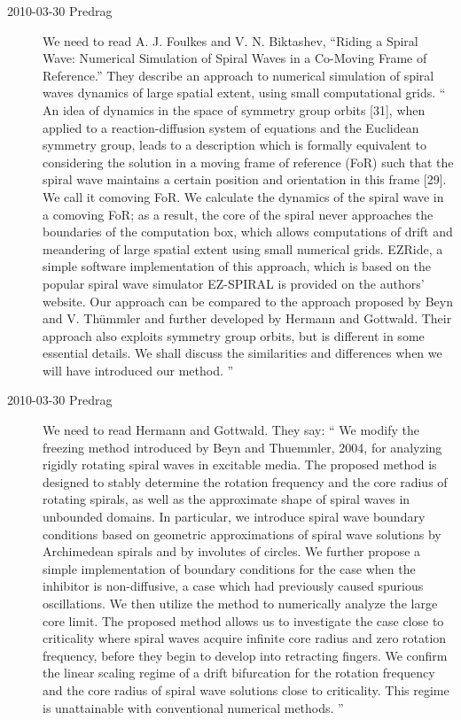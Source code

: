 \begin{description}
\item[2010-03-30 Predrag]
We need to read
A. J. Foulkes and V. N. Biktashev,
``Riding a Spiral Wave: Numerical Simulation of Spiral Waves
in a Co-Moving Frame of Reference.''
They describe an approach to numerical simulation of spiral
waves dynamics of large spatial extent, using small
computational grids.
``
An idea of dynamics in the space of symmetry group
orbits [31], when applied to a reaction-diffusion system
of equations and the Euclidean symmetry group, leads to
a description which is formally equivalent to considering
the solution in a moving frame of reference (FoR) such
that the spiral wave maintains a certain position and orientation
in this frame [29]. We call it comoving FoR.
We calculate
the dynamics of the spiral wave in a comoving FoR;
as a result, the core of the spiral never approaches the
boundaries of the computation box, which allows computations
of drift and meandering of large spatial extent using
small numerical grids. EZRide, a simple software implementation
of this approach, which is based on the popular spiral
wave simulator EZ-SPIRAL is provided on the authors' website.
Our approach can be compared to the approach proposed
by Beyn and V. Th\"ummler and further developed
by Hermann and Gottwald. Their approach also exploits
symmetry group orbits, but is different in some
essential details. We shall discuss the similarities and
differences when we will have introduced our method.
''

\item[2010-03-30 Predrag]
We need to read
    {Hermann and Gottwald}. They say:
``
We modify the freezing method introduced by Beyn and
Thuemmler, 2004, for analyzing rigidly rotating spiral waves
in excitable media. The proposed method is designed to stably
determine the rotation frequency and the core radius of
rotating spirals, as well as the approximate shape of spiral
waves in unbounded domains. In particular, we introduce
spiral wave boundary conditions based on geometric
approximations of spiral wave solutions by Archimedean
spirals and by involutes of circles. We further propose a
simple implementation of boundary conditions for the case
when the inhibitor is non-diffusive, a case which had
previously caused spurious oscillations.
We then utilize the method to numerically analyze the large
core limit. The proposed method allows us to investigate the
case close to criticality where spiral waves acquire infinite
core radius and zero rotation frequency, before they begin to
develop into retracting fingers. We confirm the linear
scaling regime of a drift bifurcation for the rotation
frequency and the core radius of spiral wave solutions close
to criticality. This regime is unattainable with conventional
numerical methods.
''



\end{description}
